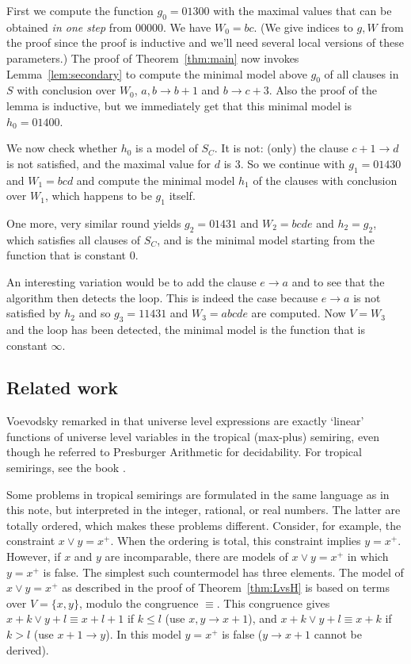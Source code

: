 \documentclass[11pt,a4paper]{article}
\newcommand\set[1]{\{#1\}}
\newcommand{\FYI}[1]{{\color{red}#1}}
\begin{document}
First we compute the function $g_0 = 01300$ with the maximal values
that can be obtained \emph{in one step} from $00000$. We have $W_0 = bc$.
(We give indices to $g,W$ from the proof since the proof is inductive 
and we'll need several local versions of these parameters.) 
The proof of Theorem~\ref{thm:main} now invokes
Lemma~\ref{lem:secondary} to compute the minimal model 
above $g_0$ of all clauses in $S$ with conclusion over $W_0$,
$a,b\to b+1$ and $b\to c+3$. Also the proof of the lemma is inductive,
but we immediately get that this minimal model is $h_0 = 01400$.

We now check whether $h_0$ is a model of $S_C$. It is not:
(only) the clause $c+1\to d$ is not satisfied, and the
maximal value for $d$ is $3$. So we continue with
$g_1 = 01430$ and $W_1 = bcd$ and compute the minimal
model $h_1$ of the clauses with conclusion over $W_1$,
which happens to be $g_1$ itself.

One more, very similar round yields
$g_2 = 01431$ and $W_2 = bcde$ and $h_2=g_2$,
which satisfies all clauses of $S_C$, and is the minimal 
model starting from the function that is constant $0$.

An interesting variation would be to add the clause
$e\to a$ and to see that the algorithm then detects
the loop. This is indeed the
case because $e\to a$ is not satisfied by $h_2$ and so
$g_3 = 11431$ and $W_3=abcde$ are computed.
Now $V=W_3$ and the loop has been detected,
the minimal model is the function that is constant $\infty$.


\subsection{Related work}

\FYI{Voevodsky remarked in \cite{VV} that universe level expressions
are exactly `linear' functions of universe level variables in the 
tropical (max-plus) semiring, even though he 
referred to Presburger Arithmetic for decidability.
For tropical semirings, see the book \cite{Butcovic}.
}

Some problems in tropical semirings are 
formulated in the same language as in this note,
but interpreted in the integer, rational, or real numbers.
The latter are totally ordered, which makes these problems different.
Consider, for example, the constraint $x\vee y = x^+$.
When the ordering is total, this constraint implies $y = x^+$.
However, if $x$ and $y$ are incomparable, there are models
of $x\vee y = x^+$ in which $y = x^+$ is false. The simplest
such countermodel has three elements. The model of $x\vee y = x^+$
as described in the proof of Theorem~\ref{thm:LvsH} is based
on terms over $V=\set{x,y}$, modulo the congruence $\equiv$.
This congruence gives ${x+k \vee y+l} \equiv {x+l+1}$ if $k\leqslant l$
(use $x,y \to x+1$),
and ${x+k \vee y+l} \equiv {x+k}$ if $k>l$
(use $x+1\to y$).
In this model $y = x^+$ is false ($y\to x+1$ cannot be derived).
\end{document}
